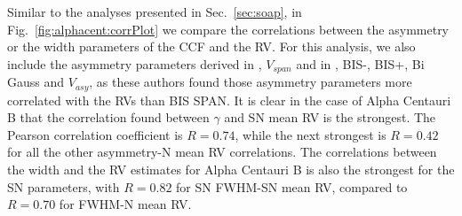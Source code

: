 \documentclass{aa}
\begin{document}
Similar to the analyses presented in Sec.~\ref{sec:soap}, in Fig.~\ref{fig:alphacent:corrPlot} we compare the correlations between the asymmetry or the width parameters of the CCF and the RV. 
For this analysis, we also include the asymmetry parameters derived in \citet{Boisse-2011}, $V_{span}$ and in \citet{Figueira-2013}, BIS-, BIS+, Bi Gauss and $V_{asy}$, as these authors found those asymmetry parameters more correlated with the RVs than BIS SPAN. It is clear in the case of Alpha Centauri B that the correlation found between $\gamma$ and SN mean RV is the strongest. 
The Pearson correlation coefficient is $R=0.74$, while the next strongest is $R=0.42$ for all the other asymmetry-N mean RV correlations.
The correlations between the width and the RV estimates for Alpha Centauri B is also the strongest for the SN parameters, with $R=0.82$ for SN FWHM-SN mean RV, compared to $R=0.70$ for FWHM-N mean RV.
%
%
\end{document}
